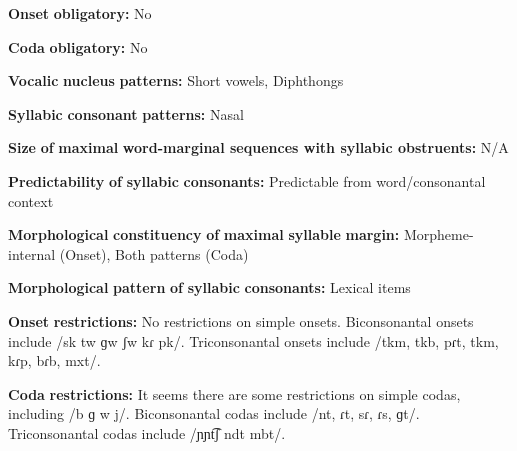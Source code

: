 \begin{styleBody}
\textbf{Onset} \textbf{obligatory:} No
\end{styleBody}

\begin{styleBody}
\textbf{Coda} \textbf{obligatory:} No
\end{styleBody}

\begin{styleBody}
\textbf{Vocalic} \textbf{nucleus} \textbf{patterns:} Short vowels, Diphthongs
\end{styleBody}

\begin{styleBody}
\textbf{Syllabic} \textbf{consonant} \textbf{patterns:} Nasal
\end{styleBody}

\begin{styleBody}
\textbf{Size} \textbf{of} \textbf{maximal} \textbf{word{}-marginal sequences with syllabic obstruents:} N/A
\end{styleBody}

\begin{styleBody}
\textbf{Predictability} \textbf{of} \textbf{syllabic} \textbf{consonants:} Predictable from word/consonantal context
\end{styleBody}

\begin{styleBody}
\textbf{Morphological} \textbf{constituency} \textbf{of} \textbf{maximal} \textbf{syllable} \textbf{margin:} Morpheme-internal (Onset), Both patterns (Coda)
\end{styleBody}

\begin{styleBody}
\textbf{Morphological} \textbf{pattern} \textbf{of} \textbf{syllabic} \textbf{consonants:} Lexical items
\end{styleBody}

\begin{styleBody}
\textbf{Onset} \textbf{restrictions:} No restrictions on simple onsets. Biconsonantal onsets include /sk tw ɡw ʃw kɾ pk/. Triconsonantal onsets include /tkm, tkb, pɾt, tkm, kɾp, bɾb, mxt/.
\end{styleBody}

\begin{styleBody}
\textbf{Coda} \textbf{restrictions:} It seems there are some restrictions on simple codas, including /b ɡ w j/. Biconsonantal codas include /nt, ɾt, sɾ, ɾs, ɡt/. Triconsonantal codas include /ɲɲt͡ʃ ndt mbt/.
\end{styleBody}

